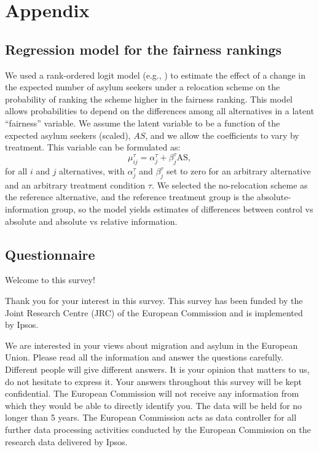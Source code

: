 \documentclass[
  12pt,
  a4paper,
]{article}
\begin{document}
\section{Appendix}\label{appendix}

\subsection{Regression model for the fairness rankings}\label{regression-model-for-the-fairness-rankings}

We used a rank-ordered logit model (e.g., ) to estimate the effect of a change in the expected number of asylum seekers under a relocation scheme on the probability of ranking the scheme higher in the fairness ranking. This model allows probabilities to depend on the differences among all alternatives in a latent ``fairness'' variable. We assume the latent variable to be a function of the expected asylum seekers (scaled), \(AS\), and we allow the coefficients to vary by treatment. This variable can be formulated as:
\[
    \mu_{ij}^{\tau} = \alpha_{j}^{\tau} + \beta_{j}^{\tau} \text{AS},
\]
for all \(i\) and \(j\) alternatives, with \(\alpha_{j}^{\tau}\) and \(\beta_{j}^{\tau}\) set to zero for an arbitrary alternative and an arbitrary treatment condition \(\tau\). We selected the no-relocation scheme as the reference alternative, and the reference treatment group is the absolute-information group, so the model yields estimates of differences between control vs absolute and absolute vs relative information.

\subsection{Questionnaire}\label{questionnaire}

Welcome to this survey!

Thank you for your interest in this survey. This survey has been funded by the Joint Research Centre (JRC) of the European Commission and is implemented by Ipsos.

We are interested in your views about migration and asylum in the European Union. Please read all the information and answer the questions carefully. Different people will give different answers. It is your opinion that matters to us, do not hesitate to express it.
Your answers throughout this survey will be kept confidential. The European Commission will not receive any information from which they would be able to directly identify you. The data will be held for no longer than 5 years. The European Commission acts as data controller for all further data processing activities conducted by the European Commission on the research data delivered by Ipsos.
\end{document}
